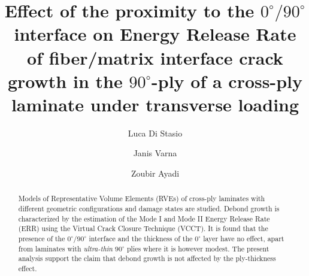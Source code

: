 \documentclass[review]{elsarticle}
\begin{document}
\begin{frontmatter}

\title{Effect of the proximity to the $0^{\circ}/90^{\circ}$ interface on Energy Release Rate of fiber/matrix interface crack growth in the  $90^{\circ}$-ply of a cross-ply laminate under transverse loading}


\author[lulea,nancy]{Luca Di Stasio}
\author[lulea]{Janis Varna}
\author[nancy]{Zoubir Ayadi}


\address[lulea]{Lule\aa\ University of Technology, University Campus, SE-97187 Lule\aa, Sweden}
\address[nancy]{Universit\'e de Lorraine, EEIGM, IJL, 6 Rue Bastien Lepage, F-54010 Nancy, France}

\begin{abstract}
\noindent
Models of Representative Volume Elements (RVEs) of cross-ply laminates with different geometric configurations and damage states are studied. Debond growth is characterized by the estimation of the Mode I and Mode II Energy Release Rate (ERR) using the Virtual Crack Closure Technique (VCCT). It is found that the presence of the $0^{\circ}/90^{\circ}$ interface and the thickness of the $0^{\circ}$ layer have no effect, apart from laminates with \emph{ultra-thin} $90^{\circ}$ plies where it is however modest. The present analysis support the claim that debond growth is not affected by the ply-thickness effect.
\end{abstract}


\end{frontmatter}
\end{document}
